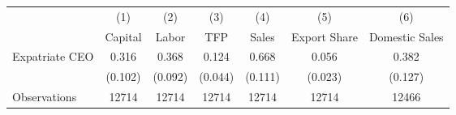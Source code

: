 \begin{tabular}{l*{6}{c}}
\hline\hline
                    &\multicolumn{1}{c}{(1)}&\multicolumn{1}{c}{(2)}&\multicolumn{1}{c}{(3)}&\multicolumn{1}{c}{(4)}&\multicolumn{1}{c}{(5)}&\multicolumn{1}{c}{(6)}\\
                    &\multicolumn{1}{c}{Capital}&\multicolumn{1}{c}{Labor}&\multicolumn{1}{c}{TFP}&\multicolumn{1}{c}{Sales}&\multicolumn{1}{c}{Export Share}&\multicolumn{1}{c}{Domestic Sales}\\
\hline
Expatriate CEO      &       0.316&       0.368&       0.124&       0.668&       0.056&       0.382\\
                    &     (0.102)&     (0.092)&     (0.044)&     (0.111)&     (0.023)&     (0.127)\\
\hline
Observations        &       12714&       12714&       12714&       12714&       12714&       12466\\
\hline\hline
\end{tabular}

